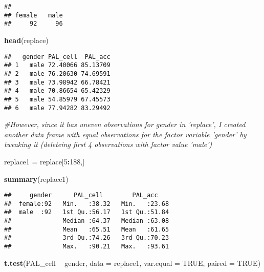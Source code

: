 \documentclass[
]{article}
\newenvironment{Shaded}{\begin{snugshade}}{\end{snugshade}}
\newcommand{\CommentTok}[1]{\textcolor[rgb]{0.56,0.35,0.01}{\textit{#1}}}
\newcommand{\DataTypeTok}[1]{\textcolor[rgb]{0.13,0.29,0.53}{#1}}
\newcommand{\DecValTok}[1]{\textcolor[rgb]{0.00,0.00,0.81}{#1}}
\newcommand{\KeywordTok}[1]{\textcolor[rgb]{0.13,0.29,0.53}{\textbf{#1}}}
\newcommand{\NormalTok}[1]{#1}
\newcommand{\OperatorTok}[1]{\textcolor[rgb]{0.81,0.36,0.00}{\textbf{#1}}}
\newcommand{\OtherTok}[1]{\textcolor[rgb]{0.56,0.35,0.01}{#1}}
\newcommand{\StringTok}[1]{\textcolor[rgb]{0.31,0.60,0.02}{#1}}
\begin{document}
\begin{verbatim}
## 
## female   male 
##     92     96
\end{verbatim}

\begin{Shaded}
\begin{Highlighting}[]
\KeywordTok{head}\NormalTok{(replace)}
\end{Highlighting}
\end{Shaded}

\begin{verbatim}
##   gender PAL_cell  PAL_acc
## 1   male 72.40066 85.13709
## 2   male 76.20630 74.69591
## 3   male 73.98942 66.78421
## 4   male 70.86654 65.42329
## 5   male 54.85979 67.45573
## 6   male 77.94282 83.29492
\end{verbatim}

\begin{Shaded}
\begin{Highlighting}[]
\CommentTok{#However, since it has uneven observations for gender in 'replace', I created another data frame with equal observations for the factor variable 'gender' by tweaking it (deleteing first 4 observations with  factor value 'male')}

\NormalTok{replace1 =}\StringTok{ }\NormalTok{replace[}\DecValTok{5}\OperatorTok{:}\DecValTok{188}\NormalTok{,]}

\KeywordTok{summary}\NormalTok{(replace1)}
\end{Highlighting}
\end{Shaded}

\begin{verbatim}
##     gender      PAL_cell        PAL_acc     
##  female:92   Min.   :38.32   Min.   :23.68  
##  male  :92   1st Qu.:56.17   1st Qu.:51.84  
##              Median :64.37   Median :63.08  
##              Mean   :65.51   Mean   :61.65  
##              3rd Qu.:74.26   3rd Qu.:70.23  
##              Max.   :90.21   Max.   :93.61
\end{verbatim}

\begin{Shaded}
\begin{Highlighting}[]
\KeywordTok{t.test}\NormalTok{(PAL_cell }\OperatorTok{~}\StringTok{ }\NormalTok{gender, }\DataTypeTok{data =}\NormalTok{ replace1, }\DataTypeTok{var.equal =} \OtherTok{TRUE}\NormalTok{, }\DataTypeTok{paired =} \OtherTok{TRUE}\NormalTok{)}
\end{Highlighting}
\end{Shaded}
\end{document}
